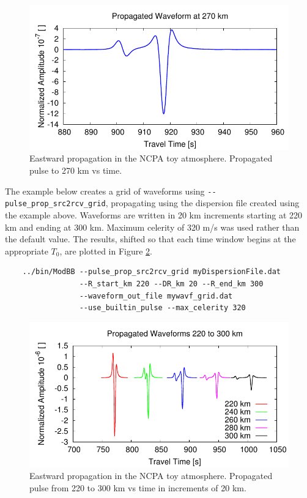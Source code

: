 \begin{figure}
\begin{center}
\includegraphics[scale=0.65]{figs/modbb_ex_prop_pulse}
\end{center}
\caption{Eastward propagation in the NCPA toy atmosphere. Propagated pulse to 270 km vs time.}
\label{fig: modbb ex prop to 270 km}
\end{figure}

The example below creates a grid of waveforms using \verb+--pulse_prop_src2rcv_grid+, propagating using the dispersion file created using the example above. Waveforms are written in 20 km increments starting at 220 km and ending at 300 km. Maximum celerity of 320 m/s was used rather than the default value. The results, shifted so that each time window begins at the appropriate $T_0$, are plotted in Figure \ref{fig: modbb ex prop 220 to 300 km}.

\begin{verbatim}
    ../bin/ModBB --pulse_prop_src2rcv_grid myDispersionFile.dat 
                 --R_start_km 220 --DR_km 20 --R_end_km 300 
                 --waveform_out_file mywavf_grid.dat 
                 --use_builtin_pulse --max_celerity 320
\end{verbatim}

\begin{figure}
\begin{center}
\includegraphics[scale=0.65]{figs/modbb_ex_prop_pulse_grid}
\end{center}
\caption{Eastward propagation in the NCPA toy atmosphere. Propagated pulse from 220 to 300 km vs time in increments of 20 km.}
\label{fig: modbb ex prop 220 to 300 km}
\end{figure}

